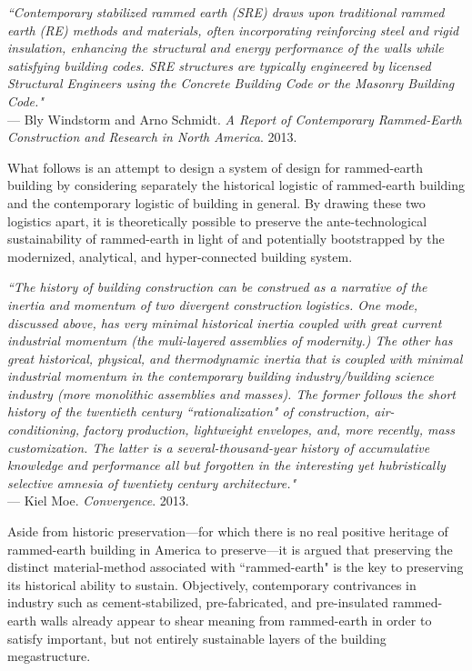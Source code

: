 \begin{flushright}
\small{
\textit{
``Contemporary stabilized rammed earth (SRE) draws upon traditional rammed earth (RE) methods and materials, often incorporating reinforcing steel and rigid insulation, enhancing the structural and energy performance of the walls while satisfying building codes. SRE structures are typically engineered by licensed Structural Engineers using the Concrete Building Code or the Masonry Building Code."}} \\ --- Bly Windstorm and Arno Schmidt. \textit{A Report of Contemporary Rammed-Earth Construction and Research in North America}. 2013.
\end{flushright}

What follows is an attempt to design a system of design for rammed-earth building by considering separately the historical logistic of rammed-earth building and the contemporary logistic of building in general. By drawing these two logistics apart, it is theoretically possible to preserve the ante-technological sustainability of rammed-earth in light of and potentially bootstrapped by the modernized, analytical, and hyper-connected building system.

\begin{flushright}
  \small{
  \textit{``The history of building construction can be construed as a narrative of the inertia and momentum of two divergent construction logistics. One mode, discussed above, has very minimal historical inertia coupled with great current industrial momentum (the muli-layered assemblies of modernity.) The other has great historical, physical, and thermodynamic inertia that is coupled with minimal industrial momentum in the contemporary building industry/building science industry (more monolithic assemblies and masses). The former follows the short history of the twentieth century ``rationalization" of construction, air-conditioning, factory production, lightweight envelopes, and, more recently, mass customization. The latter is a several-thousand-year history of accumulative knowledge and performance all but forgotten in the interesting yet hubristically selective amnesia of twentiety century architecture."}}\\ --- Kiel Moe. \textit{Convergence}. 2013.
\end{flushright}



Aside from historic preservation---for which there is no real positive heritage of rammed-earth building in America to preserve---it is argued that preserving the distinct material-method associated with ``rammed-earth" is the key to preserving its historical ability to sustain. Objectively, contemporary contrivances in industry such as cement-stabilized, pre-fabricated, and pre-insulated rammed-earth walls already appear to shear meaning from rammed-earth in order to satisfy important, but not entirely sustainable layers of the building megastructure.

